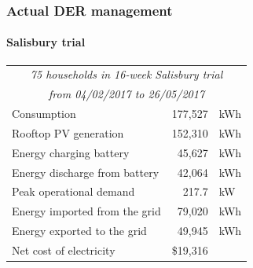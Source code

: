 \documentclass[handout, smaller, xcolor=table]{beamer}			%
\begin{document}
\begin{frame}
	\frametitle{Actual DER management}
	\framesubtitle{Salisbury trial}

	\begin{table}
	\centering
	\begin{tabular}{l r @{ } l}
		\toprule
		\multicolumn{3}{c}{\textit{75 households in 16-week Salisbury trial}}	\\
		\multicolumn{3}{c}{\textit{from 04/02/2017 to 26/05/2017}}	\\
		\midrule
		Consumption				& 177,527&kWh	\\
		Rooftop PV generation 		& 152,310&kWh	\\
		Energy charging battery		& 45,627&kWh		\\
		Energy discharge from battery	& 42,064&kWh		\\
		Peak operational demand		& 217.7&kW		\\
		Energy imported from the grid	& 79,020&kWh		\\
		Energy exported to the grid	& 49,945&kWh		\\
		Net cost of electricity			& \$19,316&		\\
		\bottomrule
	\end{tabular}
	\end{table}

\end{frame}
\end{document}
